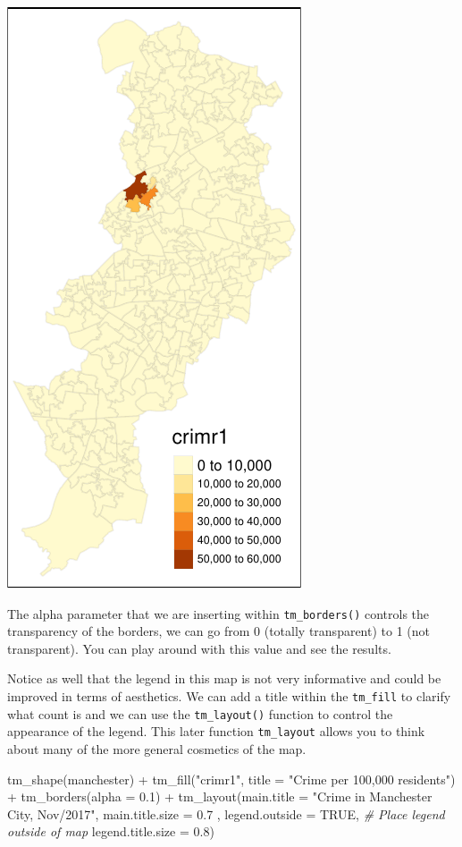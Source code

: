 \documentclass[
]{book}
\makeatletter
\newenvironment{Shaded}{\begin{snugshade}}{\end{snugshade}}
\newcommand{\AttributeTok}[1]{\textcolor[rgb]{0.61,0.61,0.61}{#1}}
\newcommand{\CommentTok}[1]{\textcolor[rgb]{0.37,0.37,0.37}{\textit{#1}}}
\newcommand{\ConstantTok}[1]{\textcolor[rgb]{0,0,0}{#1}}
\newcommand{\FloatTok}[1]{\textcolor[rgb]{0.06,0.06,0.06}{#1}}
\newcommand{\FunctionTok}[1]{\textcolor[rgb]{0,0,0}{#1}}
\newcommand{\NormalTok}[1]{#1}
\newcommand{\SpecialCharTok}[1]{\textcolor[rgb]{0,0,0}{#1}}
\newcommand{\StringTok}[1]{\textcolor[rgb]{0.5,0.5,0.5}{#1}}
\newenvironment{kframe}{%
\medskip{}
\setlength{\fboxsep}{.8em}
 \def\at@end@of@kframe{}%
 \ifinner\ifhmode%
  \def\at@end@of@kframe{\end{minipage}}%
  \begin{minipage}{\columnwidth}%
 \fi\fi%
 \def\FrameCommand##1{\hskip\@totalleftmargin \hskip-\fboxsep
 \colorbox{shadecolor}{##1}\hskip-\fboxsep
     \hskip-\linewidth \hskip-\@totalleftmargin \hskip\columnwidth}%
 \MakeFramed {\advance\hsize-\width
   \@totalleftmargin\z@ \linewidth\hsize
   \@setminipage}}%
 {\par\unskip\endMakeFramed%
 \at@end@of@kframe}
\renewenvironment{Shaded}{\begin{kframe}}{\end{kframe}}
\makeatother
\begin{document}
\includegraphics{crime_mapping_files/figure-latex/unnamed-chunk-86-1.pdf}

The alpha parameter that we are inserting within \texttt{tm\_borders()} controls the transparency of the borders, we can go from 0 (totally transparent) to 1 (not transparent). You can play around with this value and see the results.

Notice as well that the legend in this map is not very informative and could be improved in terms of aesthetics. We can add a title within the \texttt{tm\_fill} to clarify what count is and we can use the \texttt{tm\_layout()} function to control the appearance of the legend. This later function \texttt{tm\_layout} allows you to think about many of the more general cosmetics of the map.

\begin{Shaded}
\begin{Highlighting}[]
\FunctionTok{tm\_shape}\NormalTok{(manchester) }\SpecialCharTok{+} 
  \FunctionTok{tm\_fill}\NormalTok{(}\StringTok{"crimr1"}\NormalTok{, }\AttributeTok{title =} \StringTok{"Crime per 100,000 residents"}\NormalTok{) }\SpecialCharTok{+}
  \FunctionTok{tm\_borders}\NormalTok{(}\AttributeTok{alpha =} \FloatTok{0.1}\NormalTok{) }\SpecialCharTok{+}
  \FunctionTok{tm\_layout}\NormalTok{(}\AttributeTok{main.title =} \StringTok{"Crime in Manchester City, Nov/2017"}\NormalTok{, }
            \AttributeTok{main.title.size =} \FloatTok{0.7}\NormalTok{ ,}
            \AttributeTok{legend.outside =} \ConstantTok{TRUE}\NormalTok{,  }\CommentTok{\# Place legend outside of map }
            \AttributeTok{legend.title.size =} \FloatTok{0.8}\NormalTok{)}
\end{Highlighting}
\end{Shaded}
\end{document}

